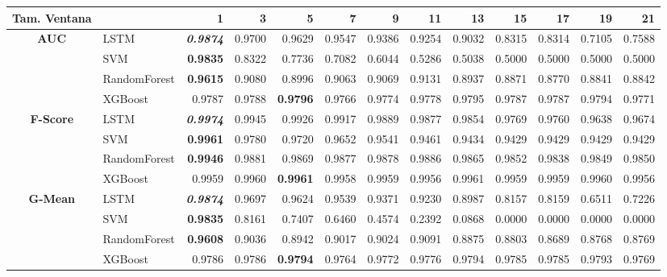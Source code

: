 \begin{table}[H]
	\centering
	\begin{adjustbox}{max width=14cm}
		\begin{tabular}{|c|l|r|r|r|r|r|r|r|r|r|r|r|}
			\hline
			\textbf{Tam. Ventana}&         &      1  &      3  &      5  &      7  &      9  &      11 &      13 &      15 &      17 &      19 &      21 \\
			\hline
			\textbf{AUC} &  LSTM & \textit{ \textbf{  0.9874 } } &  0.9700 &  0.9629 &  0.9547 &  0.9386 &  0.9254 &  0.9032 &  0.8315 &  0.8314 &  0.7105 &  0.7588 \\
			&  SVM & \textbf{  0.9835 } &  0.8322 &  0.7736 &  0.7082 &  0.6044 &  0.5286 &  0.5038 &  0.5000 &  0.5000 &  0.5000 &  0.5000 \\
			&  RandomForest & \textbf{  0.9615 } &  0.9080 &  0.8996 &  0.9063 &  0.9069 &  0.9131 &  0.8937 &  0.8871 &  0.8770 &  0.8841 &  0.8842 \\
			&  XGBoost &  0.9787 &  0.9788 & \textbf{  0.9796 } &  0.9766 &  0.9774 &  0.9778 &  0.9795 &  0.9787 &  0.9787 &  0.9794 &  0.9771 \\
			\hline
			\textbf{F-Score} &  LSTM & \textit{ \textbf{  0.9974 } } &  0.9945 &  0.9926 &  0.9917 &  0.9889 &  0.9877 &  0.9854 &  0.9769 &  0.9760 &  0.9638 &  0.9674 \\
			&  SVM & \textbf{  0.9961 } &  0.9780 &  0.9720 &  0.9652 &  0.9541 &  0.9461 &  0.9434 &  0.9429 &  0.9429 &  0.9429 &  0.9429 \\
			&  RandomForest & \textbf{  0.9946 } &  0.9881 &  0.9869 &  0.9877 &  0.9878 &  0.9886 &  0.9865 &  0.9852 &  0.9838 &  0.9849 &  0.9850 \\
			&  XGBoost &  0.9959 &  0.9960 & \textbf{  0.9961 } &  0.9958 &  0.9959 &  0.9956 &  0.9961 &  0.9959 &  0.9959 &  0.9960 &  0.9956 \\
			\hline
			\textbf{G-Mean} &  LSTM & \textit{ \textbf{  0.9874 } } &  0.9697 &  0.9624 &  0.9539 &  0.9371 &  0.9230 &  0.8987 &  0.8157 &  0.8159 &  0.6511 &  0.7226 \\
			&  SVM & \textbf{  0.9835 } &  0.8161 &  0.7407 &  0.6460 &  0.4574 &  0.2392 &  0.0868 &  0.0000 &  0.0000 &  0.0000 &  0.0000 \\
			&  RandomForest & \textbf{  0.9608 } &  0.9036 &  0.8942 &  0.9017 &  0.9024 &  0.9091 &  0.8875 &  0.8803 &  0.8689 &  0.8768 &  0.8769 \\
			&  XGBoost &  0.9786 &  0.9786 & \textbf{  0.9794 } &  0.9764 &  0.9772 &  0.9776 &  0.9794 &  0.9785 &  0.9785 &  0.9793 &  0.9769 \\

\end{tabular}
\end{adjustbox}
\end{table}
